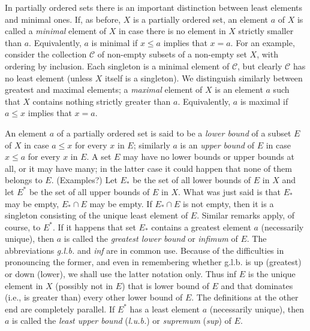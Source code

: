 In partially ordered sets there is an important distinction between least elements and minimal ones. If, as before, $X$ is a partially ordered set, an element $a$ of $X$ is called a \textit{minimal} element of $X$ in case there is no element in $X$ strictly smaller than $a$. Equivalently, $a$ is minimal if $x \le a$ implies that $x = a$. For an example, consider the collection $\mathcal{C}$ of non-empty subsets of a non-empty set $X$, with ordering by inclusion. Each singleton is a minimal element of $\mathcal{C}$, but clearly $\mathcal{C}$ has no least element (unless $X$ itself is a singleton). We distinguish similarly between greatest and maximal elements; a \textit{maximal} element of $X$ is an element $a$ such that $X$ contains nothing strictly greater than $a$. Equivalently, $a$ is maximal if $a \le x$ implies that $x = a$.
 
An element $a$ of a partially ordered set is said to be a \textit{lower bound} of a subset $E$ of $X$ in case $a \le x$ for every $x$ in $E$; similarly $a$ is an \textit{upper bound} of $E$ in case $x \le a$ for every $x$ in $E$. A set $E$ may have no lower bounds or upper bounds at all, or it may have many; in the latter case it could happen that none of them belongs to $E$. (Examples?) Let $E_{*}$ be the set of all lower bounds of $E$ in $X$ and let $E^{*}$ be the set of all upper bounds of $E$ in $X$. What was just said is that $E_{*}$ may be empty, $E_{*} \cap E$ may be empty. If $E_{*} \cap E$ is not empty, then it is a singleton consisting of the unique least element of $E$. Similar remarks apply, of course, to $E^{*}$. If it happens that set $E_{*}$ contains a greatest element $a$ (necessarily unique), then $a$ is called the \textit{greatest lower bound} or \textit{infimum} of $E$. The abbreviations \textit{g.l.b.} and \textit{inf} are in common use. Because of the difficulties in pronouncing the former, and even in remembering whether g.l.b. is up (greatest) or down (lower), we shall use the latter notation only. Thus inf $E$ is the unique element in $X$ (possibly not in $E$) that is lower bound of $E$ and that dominates (i.e., is greater than) every other lower bound of $E$. The definitions at the other end are completely parallel. If $E^{*}$ has a least element $a$ (necessarily unique), then $a$ is called the \textit{least upper bound} (\textit{l.u.b.}) or \textit{supremum} (\textit{sup}) of $E$. 

